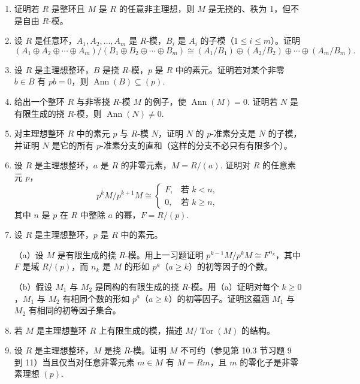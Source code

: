 \begin{enumerate}
\item 证明若 \(R\) 是整环且 \(M\) 是 \(R\) 的任意非主理想，则 \(M\) 是无挠的、秩为 1，但不是自由 \(R\)-模。

\item 设 \(R\) 是任意环，\(A_1, A_2, \ldots, A_m\) 是 \(R\)-模，\(B_i\) 是 \(A_i\) 的子模（\(1 \leq i \leq m\)）。证明
\[
(A_1 \oplus A_2 \oplus \cdots \oplus A_m)/(B_1 \oplus B_2 \oplus \cdots \oplus B_m) \cong (A_1/B_1) \oplus (A_2/B_2) \oplus \cdots \oplus (A_m/B_m).
\]

\item 设 \(R\) 是主理想整环，\(B\) 是挠 \(R\)-模，\(p\) 是 \(R\) 中的素元。证明若对某个非零 \(b \in B\) 有 \(pb = 0\)，则 \(\operatorname{Ann}(B) \subseteq (p)\).

\item 给出一个整环 \(R\) 与非零挠 \(R\)-模 \(M\) 的例子，使 \(\operatorname{Ann}(M) = 0\). 证明若 \(N\) 是有限生成的挠 \(R\)-模，则 \(\operatorname{Ann}(N) \neq 0\).

\item 对主理想整环 \(R\) 中的素元 \(p\) 与 \(R\)-模 \(N\)，证明 \(N\) 的 \(p\)-准素分支是 \(N\) 的子模，并证明 \(N\) 是它的所有 \(p\)-准素分支的直和（这样的分支不必只有有限多个）。

\item 设 \(R\) 是主理想整环，\(a\) 是 \(R\) 的非零元素，\(M = R/(a)\). 证明对 \(R\) 的任意素元 \(p\)，
\[
p^kM/p^{k+1}M \cong \begin{cases} F, & \text{若 } k < n, \\ 0, & \text{若 } k \geq n, \end{cases}
\]
其中 \(n\) 是 \(p\) 在 \(R\) 中整除 \(a\) 的幂，\(F = R/(p)\).

\item 设 \(R\) 是主理想整环，\(p\) 是 \(R\) 中的素元。

（a）设 \(M\) 是有限生成的挠 \(R\)-模。用上一习题证明 \(p^{k-1}M/p^kM \cong F^{n_k}\)，其中 \(F\) 是域 \(R/(p)\)，而 \(n_k\) 是 \(M\) 的形如 \(p^a\)（\(a \geq k\)）的初等因子的个数。

（b）假设 \(M_1\) 与 \(M_2\) 是同构的有限生成的挠 \(R\)-模。用（a）证明对每个 \(k \geq 0\)，\(M_1\) 与 \(M_2\) 有相同个数的形如 \(p^a\)（\(a \geq k\)）的初等因子。证明这蕴涵 \(M_1\) 与 \(M_2\) 有相同的初等因子集合。

\item 若 \(M\) 是主理想整环 \(R\) 上有限生成的模，描述 \(M/\operatorname{Tor}(M)\) 的结构。

\item 设 \(R\) 是主理想整环，\(M\) 是挠 \(R\)-模。证明 \(M\) 不可约（参见第 10.3 节习题 9 到 11）当且仅当对任意非零元素 \(m \in M\) 有 \(M = Rm\)，且 \(m\) 的零化子是非零素理想 \((p)\).


\end{enumerate}
